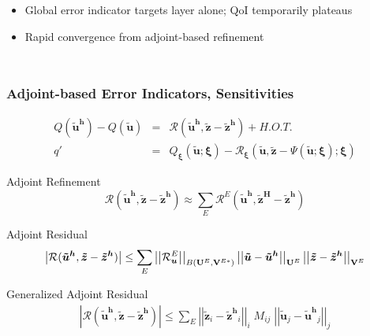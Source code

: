 \documentclass[mathserif]{beamer}
\newcommand{\abs}[1]{\ensuremath{ \left|#1\right|}}
\newcommand{\norm}[1]{\ensuremath{ \left|\left|#1\right|\right|}}
\newcommand{\bv}[1]{{\boldsymbol{#1}}}
\newcommand{\Qoi}{{\ensuremath{Q}}}
\newcommand{\qoi}{{\ensuremath{q}}}
\newcommand{\Res}{{\ensuremath{\mathcal R}}}
\newcommand{\params}{{\ensuremath{\bv{\xi}}}}
\newcommand{\Unknowns}{{\ensuremath{\bf{U}}}}
\newcommand{\unknown}{{\ensuremath{\bv{u}}}}
\newcommand{\Testfuncs}{{\ensuremath{\bf{V}}}}
\newcommand{\primalsol}{{\ensuremath{\bv{\tilde{u}}}}}
\newcommand{\primalsolh}{{\ensuremath{\bv{\tilde{u}^h}}}}
\newcommand{\adjointsol}{{\ensuremath{\bv{\tilde{z}}}}}
\newcommand{\adjointsolh}{{\ensuremath{\bv{\tilde{z}^h}}}}
\newcommand{\adjointsolH}{{\ensuremath{\bv{\tilde{z}^H}}}}
\newcommand{\Liftfunc}{{\ensuremath{\Psi}}}
\newcommand{\elem}{\ensuremath{E}}
\begin{document}
\begin{frame}
\begin{columns}
\begin{itemize}
\item Global error indicator targets layer alone; QoI temporarily plateaus
\item Rapid convergence from adjoint-based refinement
\end{itemize}

\end{columns}

\end{frame}


\begin{frame}
\frametitle{Adjoint-based Error Indicators, Sensitivities}

\vspace{-5mm}

\begin{eqnarray*}
\Qoi(\primalsolh) - \Qoi(\primalsol) & = & \Res(\primalsolh, \adjointsol - \adjointsolh) + H.O.T. \\
\qoi' & = & \Qoi_\params(\primalsol; \params) - 
        \Res_\params(\primalsol, \adjointsol - \Liftfunc(\primalsol; \params); \params)
\end{eqnarray*}

\begin{block}{Adjoint Refinement}
\begin{equation*}
\Res(\primalsolh, \adjointsol - \adjointsolh) \approx \sum_\elem 
\Res^\elem(\primalsolh, \adjointsolH - \adjointsolh)
\end{equation*}
\end{block}

\begin{block}{Adjoint Residual}
\vspace{-4mm}
\begin{equation*}
\abs{\Res(\primalsolh, \adjointsol - \adjointsolh)} \leq
\sum_\elem \norm{\Res^\elem_\unknown}_{B(\Unknowns^\elem,
\Testfuncs^{\elem *})}
\norm{\primalsol - \primalsolh}_{\Unknowns^\elem}
\norm{\adjointsol - \adjointsolh}_{\Testfuncs^\elem}
\end{equation*}
\end{block}

\begin{block}{Generalized Adjoint Residual}
\vspace{-4mm}
\begin{align*}
\abs{\Res(\primalsolh, \adjointsol - \adjointsolh)}
\leq \sum_\elem \norm{\adjointsol_i-\adjointsolh_i}_i \; M_{ij} \; \norm{\primalsol_j-\primalsolh_j
}_j \nonumber
\end{align*}
\end{block}

\end{frame}
\end{document}

